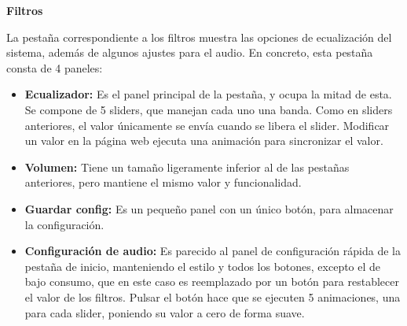 \textbf{Filtros}

La pestaña correspondiente a los filtros muestra las opciones de ecualización del sistema, además de algunos ajustes para el audio. En concreto, esta pestaña consta de 4 paneles: 
\begin{itemize}
    \item \textbf{Ecualizador:} Es el panel principal de la pestaña, y ocupa la mitad de esta. Se compone de 5 sliders, que manejan cada uno una banda. Como en sliders anteriores, el valor únicamente se envía cuando se libera el slider. Modificar un valor en la página web ejecuta una animación para sincronizar el valor.
    \item \textbf{Volumen:} Tiene un tamaño ligeramente inferior al de las pestañas anteriores, pero mantiene el mismo valor y funcionalidad.
    \item \textbf{Guardar config:} Es un pequeño panel con un único botón, para almacenar la configuración.
    \item \textbf{Configuración de audio:} Es parecido al panel de configuración rápida de la pestaña de inicio, manteniendo el estilo y todos los botones, excepto el de bajo consumo, que en este caso es reemplazado por un botón para restablecer el valor de los filtros. Pulsar el botón hace que se ejecuten 5 animaciones, una para cada slider, poniendo su valor a cero de forma suave.
\end{itemize}